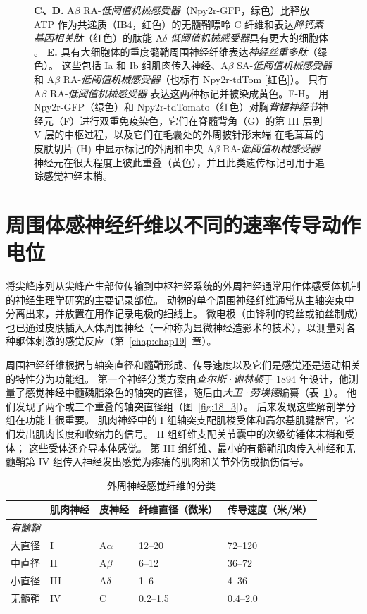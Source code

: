 \begin{figure}[htbp]
{		\textbf{C、D.} A$\beta$ RA-\textit{低阈值机械感受器}（Npy2r-GFP，绿色）比释放 ATP 作为共递质（IB4，红色）的无髓鞘嘌呤 C 纤维和表达\textit{降钙素基因相关肽}（红色）的肽能 A$\delta$ \textit{低阈值机械感受器}具有更大的细胞体 。
		\textbf{E.} 具有大细胞体的重度髓鞘周围神经纤维表达\textit{神经丝重多肽}（绿色）。
		这些包括 Ia 和 Ib 组肌肉传入神经、A$\beta$ SA-\textit{低阈值机械感受器} 和 A$\beta$ RA-\textit{低阈值机械感受器}（也标有 Npy2r-tdTom [红色]）。
		只有 A$\beta$ RA-\textit{低阈值机械感受器} 表达这两种标记并被染成黄色。F-H。
		用 Npy2r-GFP（绿色）和 Npy2r-tdTomato（红色）对胸\textit{背根神经节}神经元（F）进行双重免疫染色，它们在脊髓背角（G）的第 III 层到 V 层的中枢过程，以及它们在毛囊处的外周披针形末端 在毛茸茸的皮肤切片 (H) 中显示标记的外周和中央 A$\beta$ RA-\textit{低阈值机械感受器} 神经元在很大程度上彼此重叠（黄色），并且此类遗传标记可用于追踪感觉神经末梢。}
	\label{fig:18_2}
\end{figure}



\section{周围体感神经纤维以不同的速率传导动作电位}

将尖峰序列从尖峰产生部位传输到中枢神经系统的外周神经通常用作体感受体机制的神经生理学研究的主要记录部位。
动物的单个周围神经纤维通常从主轴突束中分离出来，并放置在用作记录电极的细线上。
微电极（由锋利的钨丝或铂丝制成）也已通过皮肤插入人体周围神经（一种称为显微神经造影术的技术），以测量对各种躯体刺激的感觉反应（第~\ref{chap:chap19}~章）。


周围神经纤维根据与轴突直径和髓鞘形成、传导速度以及它们是感觉还是运动相关的特性分为功能组。
第一个神经分类方案由\textit{查尔斯·谢林顿}于 1894 年设计，他测量了感觉神经中髓磷脂染色的轴突的直径，随后由\textit{大卫·劳埃德}编纂（表~\ref{tab:18_1}）。
他们发现了两个或三个重叠的轴突直径组（图~\ref{fig:18_3}）。
后来发现这些解剖学分组在功能上很重要。
肌肉神经中的 I 组轴突支配肌梭受体和高尔基肌腱器官，它们发出肌肉长度和收缩力的信号。
II 组纤维支配关节囊中的次级纺锤体末梢和受体；
这些受体还介导本体感觉。
第 III 组纤维、最小的有髓鞘肌肉传入神经和无髓鞘第 IV 组传入神经发出感觉为疼痛的肌肉和关节外伤或损伤信号。


\begin{table}[htbp]
	\caption{外周神经感觉纤维的分类} \label{tab:18_1} \centering
	\begin{tabular}{lllll}
		\toprule
		 & 肌肉神经 & 皮神经 & 纤维直径（微米） & 传导速度（米/米）\\
		\midrule
		\textit{有髓鞘} &  &  & &  \\
		大直径 & I  & A$\alpha$ & 12–20 & 72–120 \\
		中直径 & II  & A$\beta$ & 6–12 & 36–72 \\
		小直径 & III  & A$\delta$ & 1–6 & 4–36 \\
		无髓鞘 & IV  & C & 0.2–1.5 & 0.4–2.0 \\
		\bottomrule
	\end{tabular}
\end{table}



